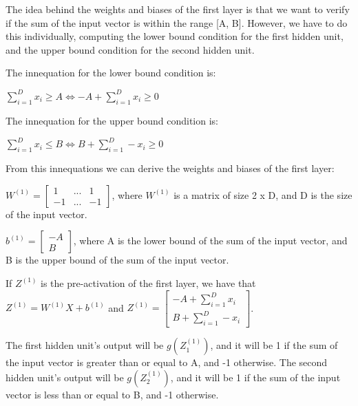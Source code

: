\documentclass{article}
\begin{document}
\bigskip

The idea behind the weights and biases of the first layer is that we want to verify if the sum of the input vector is within the range [A, B].
However, we have to do this individually, computing the lower bound condition for the first hidden unit, 
and the upper bound condition for the second hidden unit.

\bigskip

The innequation for the lower bound condition is:

\bigskip

$ \sum_{i=1}^{D} x_i \geq A \iff -A + \sum_{i=1}^{D} x_i \geq 0$

The innequation for the upper bound condition is:

\bigskip

$ \sum_{i=1}^{D} x_i \leq B \iff B + \sum_{i=1}^{D}- x_i \geq 0$

\bigskip

From this innequations we can derive the weights and biases of the first layer:

\bigskip

\( W^{(1)} = \begin{bmatrix}
    1  & ... & 1  \\
    -1 & ... & -1
\end{bmatrix}
\), where \(W^{(1)}\) is a matrix of size 2 x D, and D is the size of the input vector.

\(b^{(1)} = \begin{bmatrix}
    -A \\
    B
\end{bmatrix}
\), where A is the lower bound of the sum of the input vector, and B is the upper bound of the sum of the input vector. 

\bigskip

If $Z^{(1)}$ is the pre-activation of the first layer, we have that $Z^{(1)} = W^{(1)}X + b^{(1)}$ and
$Z^{(1)} = \begin{bmatrix}
    -A + \sum_{i=1}^{D} x_i\\
    B + \sum_{i=1}^{D}- x_i
\end{bmatrix}
$.

\bigskip

The first hidden unit's output will be $g(Z^{(1)}_1)$, and it will be 1 if the sum of the input vector is greater than or equal to A, 
and -1 otherwise.
The second hidden unit's output will be $g(Z^{(1)}_2)$, and it will be 1 if the sum of the input vector is less than or equal to B, 
and -1 otherwise.
\end{document}
